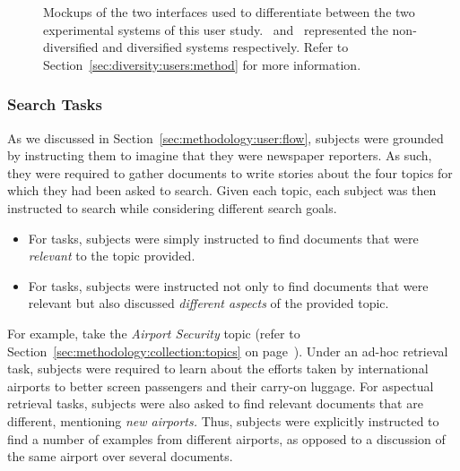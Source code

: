 \begin{figure}[t!]
    \centering
    \caption[Diversity user study interface mockups]{Mockups of the two interfaces used to differentiate between the two experimental systems of this user study. \hula~and \yoyo~represented the non-diversified and diversified systems respectively. Refer to Section~\ref{sec:diversity:users:method} for more information.}
    \label{fig:interface_headers}
\end{figure}

\subsubsection{Search Tasks}\label{sec:diversity:users:method:tasks}
As we discussed in Section~\ref{sec:methodology:user:flow}, subjects were grounded by instructing them to imagine that they were newspaper reporters. As such, they were required to gather documents to write stories about the four topics for which they had been asked to search. Given each topic, each subject was then instructed to search while considering different search goals.

\begin{itemize}
    \item{For  tasks, subjects were simply instructed to find documents that were \emph{relevant} to the topic provided.}
    \item{For  tasks, subjects were instructed not only to find documents that were relevant but also discussed \emph{different aspects} of the provided topic.}
\end{itemize}

For example, take the \emph{Airport Security} topic (refer to Section~\ref{sec:methodology:collection:topics} on page~\pageref{sec:methodology:collection:topics}). Under an ad-hoc retrieval task, subjects were required to learn about the efforts taken by international airports to better screen passengers and their carry-on luggage. For aspectual retrieval tasks, subjects were also asked to find relevant documents that are different, mentioning \emph{new airports.} Thus, subjects were explicitly instructed to find a number of examples from different airports, as opposed to a discussion of the same airport over several documents.

